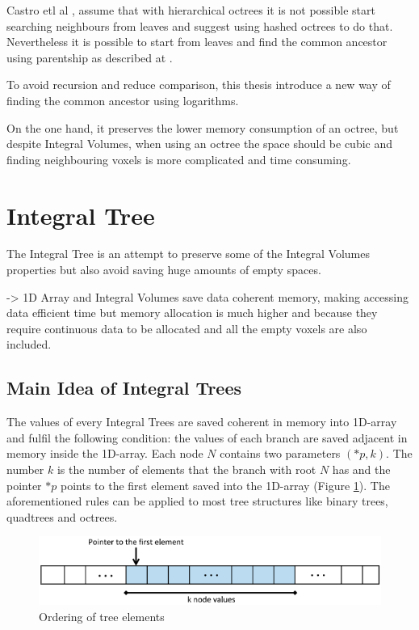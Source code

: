 \documentclass{subfiles}
\begin{document}
Castro etl al \cite{Castro2008}, assume that with hierarchical octrees it is not possible start searching neighbours from leaves and suggest using hashed octrees to do that. Nevertheless it is possible to start from leaves and find the common ancestor using parentship as described at \cite{Hanan1989}.

To avoid recursion and reduce comparison, this thesis introduce a new way of finding the  common ancestor using logarithms. 


On the one hand, it preserves the lower memory consumption of an octree, but despite Integral Volumes, when using an octree the space should be cubic and finding neighbouring voxels is more complicated and time consuming. 



\section{Integral Tree}\label{sec:ITopt}
\par The Integral Tree is an attempt to preserve some of the Integral Volumes properties but also avoid saving huge amounts of empty spaces.  

-> 1D Array and Integral Volumes save data coherent memory, making accessing data efficient time but memory allocation is much higher and because they require continuous data to be allocated and all the empty voxels are also included. 

\subsection{Main Idea of Integral Trees}

\par The values of every Integral Trees are saved coherent in memory into 1D-array and fulfil the following condition: the values of each branch are saved adjacent in memory inside the 1D-array. Each node $N$ contains two parameters $(*p, k)$. The number $k$ is the number of elements that the branch with root $N$ has and the pointer $*p$ points to the first element saved into the 1D-array (Figure \ref{fig:IntegralTreeMainIdea}). The aforementioned rules can be applied to most tree structures like binary trees, quadtrees and octrees. 

\begin{figure}[!htbp]
	\centering
	\includegraphics[width=5.5in]{img/IntegralTreeMainIdea}
	\caption{Ordering of tree elements}
	\label{fig:IntegralTreeMainIdea}
\end{figure}
\end{document}
